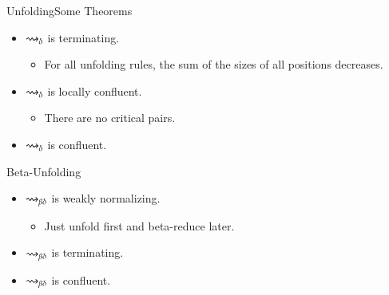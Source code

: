 \documentclass[9pt]{beamer}
\newcommand{\mypause}{\pause}
\begin{document}
\begin{frame}{Unfolding}{Some Theorems}
\begin{itemize}
\item $\rightsquigarrow_{\delta}$ is terminating. 
\begin{itemize}
\item For all unfolding rules, the sum of the sizes of all positions decreases.
\end{itemize}
%
\mypause
\item $\rightsquigarrow_{\delta}$ is locally confluent. 
\begin{itemize}
\item There are no critical pairs.
\end{itemize}
%
\mypause
\item $\rightsquigarrow_{\delta}$ is confluent. 
\end{itemize}
\end{frame}


\begin{frame}{Beta-Unfolding}
\begin{itemize}
\item $\rightsquigarrow_{\beta\delta}$ is weakly normalizing.
	\begin{itemize}
	\item Just unfold first and beta-reduce later.
	\end{itemize}
\mypause
\item $\rightsquigarrow_{\beta\delta}$ is terminating.
\mypause
\item $\rightsquigarrow_{\beta\delta}$ is confluent.
\end{itemize}
\end{frame}
\end{document}
